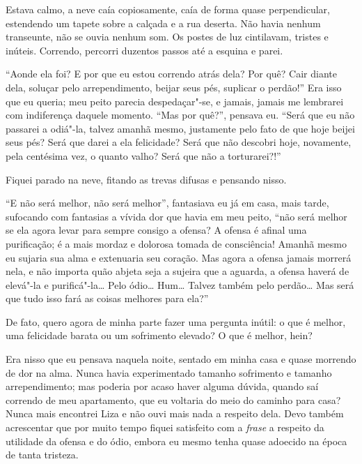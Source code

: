 Estava calmo, a neve caía copiosamente, caía de forma quase
perpendicular, estendendo um tapete sobre a calçada e a rua deserta.
Não havia nenhum transeunte, não se ouvia nenhum som. Os postes de luz
cintilavam, tristes e inúteis. Correndo, percorri duzentos passos até a
esquina e parei.

“Aonde ela foi? E por que eu estou correndo atrás dela? Por quê? Cair
diante dela, soluçar pelo arrependimento, beijar seus pés, suplicar o
perdão!” Era isso que eu queria; meu peito parecia despedaçar"-se, e
jamais, jamais me lembrarei com indiferença daquele momento. “Mas por
quê?”, pensava eu. “Será que eu não passarei a odiá"-la, talvez amanhã
mesmo, justamente pelo fato de que hoje beijei seus pés? Será que darei
a ela felicidade? Será que não descobri hoje, novamente, pela centésima
vez, o quanto valho? Será que não a torturarei?!”

Fiquei parado na neve, fitando as trevas difusas e pensando nisso.

“E não será melhor, não será melhor”, fantasiava eu já em casa, mais
tarde, sufocando com fantasias a vívida dor que havia em meu peito,
“não será melhor se ela agora levar para sempre consigo a ofensa? A
ofensa é afinal uma purificação; é a mais mordaz e dolorosa tomada de
consciência! Amanhã mesmo eu sujaria sua alma e extenuaria seu coração.
Mas agora a ofensa jamais morrerá nela, e não importa quão abjeta seja
a sujeira que a aguarda, a ofensa haverá de elevá"-la e purificá"-la\ldots{}
Pelo ódio\ldots{} Hum\ldots{} Talvez também pelo perdão\ldots{} Mas será que tudo isso
fará as coisas melhores para ela?”

De fato, quero agora de minha parte fazer uma pergunta inútil: o que é
melhor, uma felicidade barata ou um sofrimento elevado? O que é
melhor, hein?

Era nisso que eu pensava naquela noite, sentado em minha casa e quase
morrendo de dor na alma. Nunca havia experimentado tamanho sofrimento e
tamanho arrependimento; mas poderia por acaso haver alguma dúvida,
quando saí correndo de meu apartamento, que eu voltaria do meio do
caminho para casa? Nunca mais encontrei Liza e não ouvi mais nada a
respeito dela. Devo também acrescentar que por muito tempo fiquei
satisfeito com a \textit{frase} a respeito da utilidade da ofensa e do
ódio, embora eu mesmo tenha quase adoecido na época de tanta tristeza.

